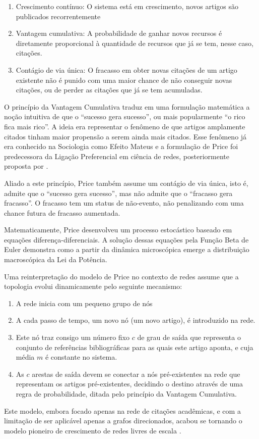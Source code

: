 \documentclass[12pt,oneside,a4paper,brazil,sumario=tradicional]{abntex2}
\begin{document}
\begin{enumerate}
  \item Crescimento contínuo: O sistema está em crescimento, novos artigos são publicados recorrentemente
  \item Vantagem cumulativa: A probabilidade de ganhar novos recursos é diretamente proporcional à quantidade de recursos que já se tem, nesse caso, citações.
  \item Contágio de via única:  O fracasso em obter novas citações de um artigo existente não é punido com uma maior chance de não conseguir novas citações, ou de perder as citações que já se tem acumuladas.
\end{enumerate}
O princípio da Vantagem Cumulativa traduz em uma formulação matemática a noção intuitiva de que o “sucesso gera sucesso”, ou mais popularmente “o rico fica mais rico”. A ideia era representar o fenômeno de que artigos amplamente citados tinham maior propensão a serem ainda mais citados. Esse fenômeno já era conhecido na Sociologia como Efeito Mateus \cite{merton1968} e a formulação de Price foi predecessora da Ligação Preferencial em ciência de redes, posteriormente proposta por .

Aliado a este princípio, Price também assume um contágio de via única, isto é, admite que o “sucesso gera sucesso”, mas não admite que o “fracasso gera fracasso”. O fracasso tem um status de não-evento, não penalizando com uma chance futura de fracasso aumentada.

Matematicamente, Price desenvolveu um processo estocástico baseado em equações diferença-diferenciais. A solução dessas equações pela Função Beta de Euler demonstra como a partir da dinâmica microscópica emerge a distribuição macroscópica da Lei da Potência.

Uma reinterpretação do modelo de Price no contexto de redes assume que a topologia evolui dinamicamente pelo seguinte mecanismo:

\begin{enumerate}
  \item A rede inicia com um pequeno grupo de nós
  \item A cada passo de tempo, um novo nó (um novo artigo), é introduzido na rede.
  \item Este nó traz consigo um número fixo $c$ de grau de saída que representa o conjunto de referências bibliográficas para as quais este artigo aponta, e cuja média $m$ é constante no sistema.
  \item As $c$ arestas de saída devem se conectar a nós pré-existentes na rede que representam os artigos pré-existentes, decidindo o destino através de uma regra de probabilidade, ditada pelo princípio da Vantagem Cumulativa.
\end{enumerate}
Este modelo, embora focado apenas na rede de citações acadêmicas, e com a limitação de ser aplicável apenas a grafos direcionados, acabou se tornando o modelo pioneiro de crescimento de redes livres de escala \cite{newman2010}.
\end{document}
